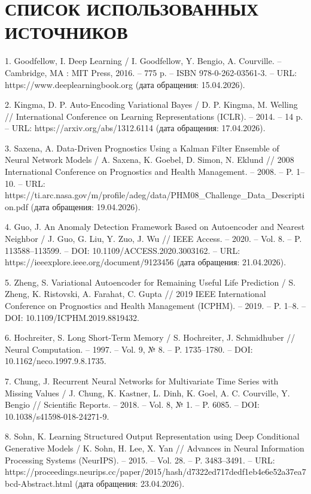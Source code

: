 \documentclass[14pt, a4paper, oneside]{extreport}
\begin{document}
\clearpage



\section{СПИСОК ИСПОЛЬЗОВАННЫХ ИСТОЧНИКОВ}
\vspace{1em}

1. Goodfellow, I. Deep Learning / I. Goodfellow, Y. Bengio, A. Courville. – Cambridge, MA : MIT Press, 2016. – 775 p. – ISBN 978-0-262-03561-3. – URL: https://www.deeplearningbook.org (дата обращения: 15.04.2026).

2. Kingma, D. P. Auto-Encoding Variational Bayes / D. P. Kingma, M. Welling // International Conference on Learning Representations (ICLR). – 2014. – 14 p. – URL: https://arxiv.org/abs/1312.6114 (дата обращения: 17.04.2026).

3. Saxena, A. Data-Driven Prognostics Using a Kalman Filter Ensemble of Neural Network Models / A. Saxena, K. Goebel, D. Simon, N. Eklund // 2008 International Conference on Prognostics and Health Management. – 2008. – P. 1–10. – URL: https://ti.arc.nasa.gov/m/profile/adeg/data/PHM08_Challenge_Data_Description.pdf (дата обращения: 19.04.2026).

4. Guo, J. An Anomaly Detection Framework Based on Autoencoder and Nearest Neighbor / J. Guo, G. Liu, Y. Zuo, J. Wu // IEEE Access. – 2020. – Vol. 8. – P. 113588–113599. – DOI: 10.1109/ACCESS.2020.3003162. – URL: https://ieeexplore.ieee.org/document/9123456 (дата обращения: 21.04.2026).

5. Zheng, S. Variational Autoencoder for Remaining Useful Life Prediction / S. Zheng, K. Ristovski, A. Farahat, C. Gupta // 2019 IEEE International Conference on Prognostics and Health Management (ICPHM). – 2019. – P. 1–8. – DOI: 10.1109/ICPHM.2019.8819432.

6. Hochreiter, S. Long Short-Term Memory / S. Hochreiter, J. Schmidhuber // Neural Computation. – 1997. – Vol. 9, № 8. – P. 1735–1780. – DOI: 10.1162/neco.1997.9.8.1735.

7. Chung, J. Recurrent Neural Networks for Multivariate Time Series with Missing Values / J. Chung, K. Kastner, L. Dinh, K. Goel, A. C. Courville, Y. Bengio // Scientific Reports. – 2018. – Vol. 8, № 1. – P. 6085. – DOI: 10.1038/s41598-018-24271-9.

8. Sohn, K. Learning Structured Output Representation using Deep Conditional Generative Models / K. Sohn, H. Lee, X. Yan // Advances in Neural Information Processing Systems (NeurIPS). – 2015. – Vol. 28. – P. 3483–3491. – URL: https://proceedings.neurips.cc/paper/2015/hash/d7322ed717dedf1eb4e6e52a37ea7bcd-Abstract.html (дата обращения: 23.04.2026).
\end{document}
